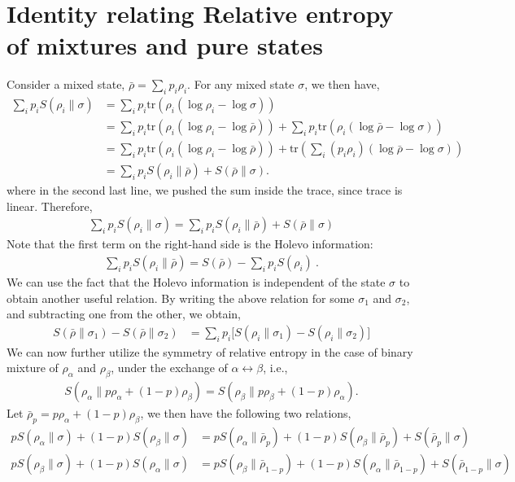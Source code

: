 \documentclass[11pt]{article}
\newcommand{\lb}{\left(}
\newcommand{\rb}{\right)}
\begin{document}
\section{Identity relating Relative entropy of mixtures and pure states}
Consider a mixed state, $\bar{\rho} = \sum_i p_i \rho_i.$
For any mixed state $\sigma$, we then have,
\begin{align}
    \sum_i p_i S(\rho_i \| \sigma) &= \sum_i p_i \text{tr}\lb \rho_i \lb \log \rho_i - \log \sigma  \rb \rb \\
    &= \sum_i p_i\text{tr} \lb \rho_i \lb \log\rho_i - \log\bar{\rho}  \rb \rb + \sum_i p_i \text{tr} \lb \rho_i \lb \log \bar{\rho} -\log \sigma \rb \rb \\
    &= \sum_i p_i\text{tr} \lb \rho_i \lb \log\rho_i - \log\bar{\rho}  \rb \rb +  \text{tr} \lb \sum_i \lb p_i\rho_i\rb \lb \log \bar{\rho} -\log \sigma \rb \rb\\
    &= \sum_i p_i S(\rho_i \| \bar{\rho}) + S(\bar{\rho} \| \sigma).
\end{align}
where in the second last line, we pushed the sum inside the trace, since trace is linear.
Therefore,
\begin{align}
\boxed{
\sum_i p_i S(\rho_i \| \sigma) = \sum_i p_i S(\rho_i \| \bar{\rho}) + S(\bar{\rho} \| \sigma)
}
\end{align}
Note that the first term on the right-hand side is the Holevo information:
\begin{align}
    \sum_i p_i S(\rho_i\|\bar{\rho})=S(\bar{\rho})-\sum_i p_i S(\rho_i)\ .
\end{align}
We can use the fact that the Holevo information is independent of the state $\sigma$ to obtain another useful relation. By writing the above relation for some $\sigma_1$ and $\sigma_2$, and subtracting one from the other, we obtain,
\begin{align}
    S(\bar{\rho}\| \sigma_1) - S(\bar{\rho}\| \sigma_2) &= \sum_i p_i \big[ S(\rho_i \|\sigma_1) - S(\rho_i \| \sigma_2) \big]
\end{align}
We can now further utilize the symmetry of relative entropy in the case of binary mixture of $\rho_\alpha$ and $\rho_\beta$, under the exchange of $\alpha \leftrightarrow\beta$, i.e.,
\begin{align}
    S(\rho_\alpha \| p\rho_\alpha + (1-p)\rho_\beta) = S( \rho_\beta \| p\rho_\beta + (1-p)\rho_\alpha). 
\end{align}
Let $\bar{\rho}_p = p \rho_\alpha + (1-p)\rho_\beta$, we then have the following two relations,
\begin{align}
    pS(\rho_\alpha \| \sigma) + (1-p) S(\rho_\beta \| \sigma) &= p S(\rho_\alpha \| \bar{\rho}_p) + (1-p) S(\rho_\beta \| \bar{\rho}_p) + S(\bar{\rho}_p\| \sigma) \\
    pS(\rho_\beta \| \sigma) + (1-p) S(\rho_\alpha \| \sigma) &= p S(\rho_\beta \| \bar{\rho}_{1-p}) + (1-p) S(\rho_\alpha \| \bar{\rho}_{1-p}) + S(\bar{\rho}_{1-p}\| \sigma)
\end{align}
\end{document}
